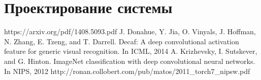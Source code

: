 \documentclass[a4paper,english,russian]{G2-105}
\begin{document}
\chapter{Проектирование системы}


\newpage
{}
\newpage
\begin{thebibliography}{1}
     https://arxiv.org/pdf/1408.5093.pdf
     J. Donahue, Y. Jia, O. Vinyals, J. Hoffman, N. Zhang, 
E. Tzeng, and T. Darrell. Decaf: A deep convolutional
activation feature for generic visual recognition. In ICML,
2014
  	  A. Krizhevsky, I. Sutskever, and G. Hinton. ImageNet
classification with deep convolutional neural networks. In
NIPS, 2012
	 http://ronan.collobert.com/pub/matos/2011\_torch7\_nipsw.pdf
\end{thebibliography}

\end{document}
